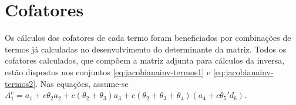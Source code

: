 

\section{Cofatores}
\label{AnexoJacobiana-Cofatores}

Os cálculos dos cofatores de cada termo foram beneficiados por combinações de termos já calculadas
no desenvolvimento do determinante da matriz. Todos os cofatores calculados, que compõem a matriz
adjunta para cálculos da inversa, estão dispostos nos conjuntos \ref{eq:jacobianainv-termos1} 
e \ref{eq:jacobianainv-termos2}. Nas equações, assume-se
$A_1^c = a_1 + c\theta_2a_2 + c(\theta_2+\theta_3)a_3 + c(\theta_2+\theta_3+\theta_4)(a_4 + c\theta_5'd_6)$.

